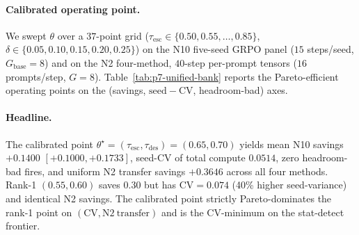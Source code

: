 \paragraph{Calibrated operating point.}
We swept $\theta$ over a $37$-point grid
($\tau_{\mathrm{esc}}\in\{0.50,0.55,\ldots,0.85\}$,
$\delta\in\{0.05,0.10,0.15,0.20,0.25\}$) on the N10 five-seed
GRPO panel ($15$ steps/seed, $G_{\mathrm{base}}{=}8$) and on the
N2 four-method, $40$-step per-prompt tensors
($16$ prompts/step, $G{=}8$). Table~\ref{tab:p7-unified-bank}
reports the Pareto-efficient operating points on the
(savings, $\mathrm{seed{-}CV}$, headroom-bad) axes.

\begin{table}[t]
\centering
\small
{}
\caption{Calibrated Adaptive-G Controller Bank Pareto-efficient
operating points (headroom-bad $= 0$ on all four ranks).
The calibrated row (2) is the lowest $\mathrm{seed{-}CV}$ operating
point whose 95\% CI on N10 savings excludes zero. The N2 column
is constant across $\theta$ because per-prompt ZVF on the N2
tensors is binary (boundary or contrast); the escalation band
$[\tau_{\mathrm{esc}},\tau_{\mathrm{des}})$ is structurally
degenerate and all N2 savings come from the de-escalation branch
(boundary prompts $z{=}1 \to G_{\mathrm{des}}{=}4$ vs $G_{\mathrm{base}}{=}8$).
\label{tab:p7-unified-bank}}
\end{table}

\paragraph{Headline.} The calibrated point
$\theta^\star = (\tau_{\mathrm{esc}}, \tau_{\mathrm{des}}) = (0.65, 0.70)$
yields mean N10 savings $+0.1400$
$[+0.1000, +0.1733]$, seed-CV of total compute $0.0514$,
zero headroom-bad fires, and uniform N2 transfer savings $+0.3646$
across all four methods. Rank-1 $(0.55, 0.60)$ saves $0.30$ but has
$\mathrm{CV}=0.074$ (40\% higher seed-variance) and identical N2
savings. The calibrated point strictly Pareto-dominates the
rank-1 point on $(\mathrm{CV}, \mathrm{N2\ transfer})$ and is the
$\mathrm{CV}$-minimum on the stat-detect frontier.

